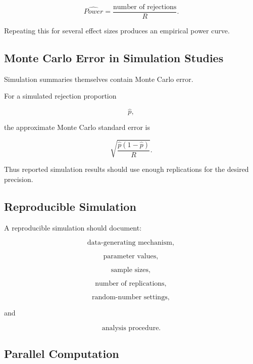 \[
\boxed{
\widehat{Power}
=
\frac{
\text{number of rejections}
}{
R
}.
}
\]

Repeating this for several effect sizes produces an empirical power curve.

\subsection{Monte Carlo Error in Simulation Studies}
\label{subsec:simulation-monte-carlo-error}

Simulation summaries themselves contain Monte Carlo error.

For a simulated rejection proportion

\[
\widehat{p},
\]

the approximate Monte Carlo standard error is

\[
\boxed{
\sqrt{
\frac{
\widehat{p}
(
1-\widehat{p}
)
}{
R
}
}.
}
\]

Thus reported simulation results should use enough replications for the
desired precision.

\subsection{Reproducible Simulation}
\label{subsec:reproducible-simulation}

A reproducible simulation should document:

\[
\boxed{
\text{data-generating mechanism},
}
\]

\[
\boxed{
\text{parameter values},
}
\]

\[
\boxed{
\text{sample sizes},
}
\]

\[
\boxed{
\text{number of replications},
}
\]

\[
\boxed{
\text{random-number settings},
}
\]

and

\[
\boxed{
\text{analysis procedure}.
}
\]

\subsection{Parallel Computation}
\label{subsec:parallel-computation-statistics}

